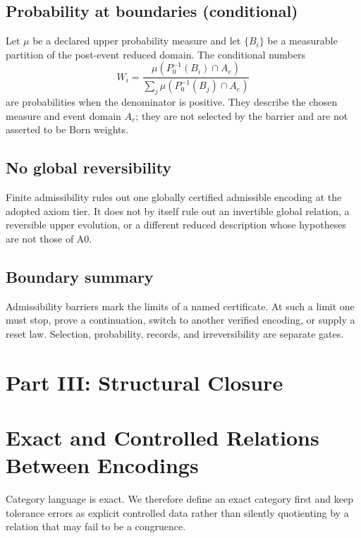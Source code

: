 \documentclass[11pt]{article}
\theoremstyle{plain}
\theoremstyle{plain}
\begin{document}
\subsection{Probability at boundaries (conditional)}

Let $\mu$ be a declared upper probability measure and let
$\{B_i\}$ be a measurable partition of the post-event reduced domain.  The
conditional numbers
\[
W_i =
\frac{\mu(P_0^{-1}(B_i)\cap A_e)}
{\sum_j \mu(P_0^{-1}(B_j)\cap A_e)}
\]
are probabilities when the denominator is positive.  They describe the
chosen measure and event domain $A_e$; they are not selected by the barrier
and are not asserted to be Born weights.

\subsection{No global reversibility}

\begin{remark}
Finite admissibility rules out one globally certified admissible encoding at
the adopted axiom tier.  It does not by itself rule out an invertible global
relation, a reversible upper evolution, or a different reduced description
whose hypotheses are not those of A0.
\end{remark}

\subsection{Boundary summary}

Admissibility barriers mark the limits of a named certificate.  At such a
limit one must stop, prove a continuation, switch to another verified
encoding, or supply a reset law.  Selection, probability, records, and
irreversibility are separate gates.
\section*{Part III: Structural Closure}
\section{Exact and Controlled Relations Between Encodings}

Category language is exact.  We therefore define an exact category first
and keep tolerance errors as explicit controlled data rather than silently
quotienting by a relation that may fail to be a congruence.
\end{document}
